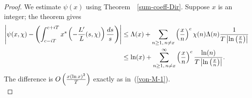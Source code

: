 \begin{proof}
 We estimate $\psi(x)$ using Theorem~~\ref{sum-coeff-Dir}. Suppose $x$ is an integer; the theorem gives
\begin{align*}
\left| {\psi(x,\chi)-\left( {
\int_{c-iT}^{c+iT} x^s\left( {-\frac{L'}{L}(s,\chi)} \right)\frac{ds}s
} \right)} \right|&\le
\Lambda(x)+
\sum_{n\ge 1,\,n\ne x} \left( {\frac{x}{n}} \right)^c\chi(n)\Lambda(n)\frac{1}{T\left| {\ln\left( {\frac{x}{n}} \right)} \right|}\\
&\le 
\ln(x)+\sum_{n\ge 1,\,n\ne x}^{\infty}\left( {\frac{x}{n}} \right)^c\frac{\ln(n)}{T\left| {\ln\left( {\frac{x}{n}} \right)} \right|}.
\end{align*}
The difference is $O\left( {\frac{x(\ln x)^2}{T}} \right)$ exactly as in~(\ref{von-M-1}).\\


\end{proof}
